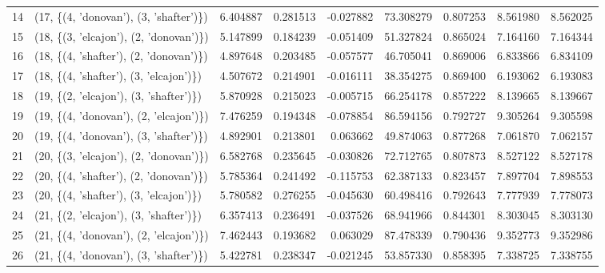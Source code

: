 \begin{tabular}{llrrrrrrr}
14 &  (17, \{(4, 'donovan'), (3, 'shafter')\}) &  6.404887 &  0.281513 & -0.027882 &   73.308279 &  0.807253 &   8.561980 &   8.562025 \\
15 &  (18, \{(3, 'elcajon'), (2, 'donovan')\}) &  5.147899 &  0.184239 & -0.051409 &   51.327824 &  0.865024 &   7.164160 &   7.164344 \\
16 &  (18, \{(4, 'shafter'), (2, 'donovan')\}) &  4.897648 &  0.203485 & -0.057577 &   46.705041 &  0.869006 &   6.833866 &   6.834109 \\
17 &  (18, \{(4, 'shafter'), (3, 'elcajon')\}) &  4.507672 &  0.214901 & -0.016111 &   38.354275 &  0.869400 &   6.193062 &   6.193083 \\
18 &  (19, \{(2, 'elcajon'), (3, 'shafter')\}) &  5.870928 &  0.215023 & -0.005715 &   66.254178 &  0.857222 &   8.139665 &   8.139667 \\
19 &  (19, \{(4, 'donovan'), (2, 'elcajon')\}) &  7.476259 &  0.194348 & -0.078854 &   86.594156 &  0.792727 &   9.305264 &   9.305598 \\
20 &  (19, \{(4, 'donovan'), (3, 'shafter')\}) &  4.892901 &  0.213801 &  0.063662 &   49.874063 &  0.877268 &   7.061870 &   7.062157 \\
21 &  (20, \{(3, 'elcajon'), (2, 'donovan')\}) &  6.582768 &  0.235645 & -0.030826 &   72.712765 &  0.807873 &   8.527122 &   8.527178 \\
22 &  (20, \{(4, 'shafter'), (2, 'donovan')\}) &  5.785364 &  0.241492 & -0.115753 &   62.387133 &  0.823457 &   7.897704 &   7.898553 \\
23 &  (20, \{(4, 'shafter'), (3, 'elcajon')\}) &  5.780582 &  0.276255 & -0.045630 &   60.498416 &  0.792643 &   7.777939 &   7.778073 \\
24 &  (21, \{(2, 'elcajon'), (3, 'shafter')\}) &  6.357413 &  0.236491 & -0.037526 &   68.941966 &  0.844301 &   8.303045 &   8.303130 \\
25 &  (21, \{(4, 'donovan'), (2, 'elcajon')\}) &  7.462443 &  0.193682 &  0.063029 &   87.478339 &  0.790436 &   9.352773 &   9.352986 \\
26 &  (21, \{(4, 'donovan'), (3, 'shafter')\}) &  5.422781 &  0.238347 & -0.021245 &   53.857330 &  0.858395 &   7.338725 &   7.338755 \\
\bottomrule
\end{tabular}
